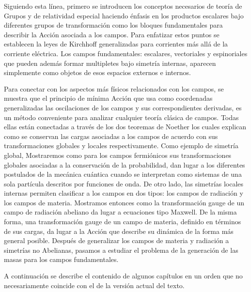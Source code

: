 Siguiendo esta línea, primero se introducen los conceptos necesarios de teoría de Grupos y de relatividad especial haciendo énfasis en los productos escalares bajo diferentes grupos de transformación como los bloques fundamentales para describir la Acción asociada a los campos. Para enfatizar estos puntos se establecen la leyes de Kirchhoff generalizadas para corrientes más allá de la corriente eléctrica. Los campos fundamentales: escalares, vectoriales y espinoriales que pueden además formar multipletes bajo simetría internas, aparecen simplemente como objetos de esos espacios externos e internos.

Para conectar con los aspectos más físicos relacionados con los campos, se muestra que el principio de mínima Acción que usa como coordenadas generalizadas las oscilaciones de los campos y sus correspondientes derivadas, es un método conveniente para analizar cualquier teoría clásica de campos. Todas ellas están conectadas a través de los dos teoremas de Noether los cuales explican como se conservan las cargas asociadas a los campos de acuerdo con sus transformaciones globales y locales respectivamente.
%
Como ejemplo de simetría global, Mostraremos como para los campos
fermiónicos sus transformaciones globales asociadas a la conservación
de la probabilidad, dan lugar a los diferentes postulados de la
mecánica cuántica cuando se interpretan como sistemas de una sola
partícula descritos por funciones de onda.
%
De otro lado, las simetrías locales internas permiten clasificar a los campos en dos tipos: los campos de radiación y los campos de materia. Mostramos entonces como la transformación gauge de un campo de radiación abeliano da lugar a ecuaciones tipo Maxwell.  De la misma forma, una transformación gauge de un campo de materia, definido en términos de sus cargas, da lugar a la Acción que describe su dinámica de la forma más general posible. Después de generalizar los campos de materia y radiación a simetrías no Abelianas, pasamos a estudiar el problema de la generación de las masas para los campos fundamentales. 

A continuación se describe el contenido de algunos capítulos en un orden que no necesariamente coincide con el de la versión actual del texto.


